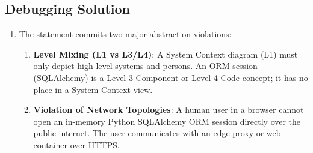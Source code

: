 \subsection*{Debugging Solution}
\begin{enumerate}[leftmargin=18pt]
  \item The statement commits two major abstraction violations:
  \begin{enumerate}
    \item \textbf{Level Mixing (L1 vs L3/L4)}: A System Context diagram (L1) must only depict high-level systems and persons. An ORM session (SQLAlchemy) is a Level 3 Component or Level 4 Code concept; it has no place in a System Context view.
    \item \textbf{Violation of Network Topologies}: A human user in a browser cannot open an in-memory Python SQLAlchemy ORM session directly over the public internet. The user communicates with an edge proxy or web container over HTTPS.
  \end{enumerate}
\end{enumerate}

